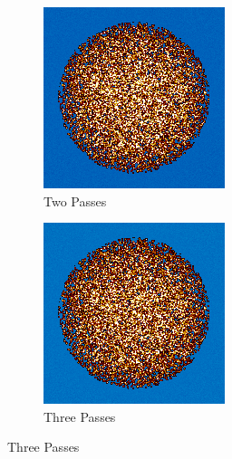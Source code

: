 \begin{figure}[H]\ContinuedFloat
\centering

\begin{subfigure}{0.4\textwidth}
  \includegraphics[width=0.95\linewidth]{figures/burn-20-bstep2}
  \caption{Two Passes}
  \label{fig:bstep2}
\end{subfigure}%
%
\begin{subfigure}{0.4\textwidth}
  \includegraphics[width=0.95\linewidth]{figures/burn-20-bstep3}
  \caption{Three Passes}
  \label{fig:bstep3}
\end{subfigure}%


\end{figure}
